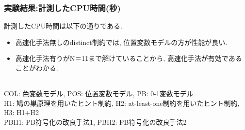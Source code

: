 \documentclass [dvipdfmx,11pt]{beamer}
\begin{document}
\begin{frame}
    \frametitle{実験結果:計測したCPU時間(秒)}
    計測したCPU時間は以下の通りである.
    \begin{block}{}
        {\tiny  }
    \end{block}
    \begin{itemize}
        \item 高速化手法無しのdistinct制約では, 位置変数モデルの方が性能が良い.
        \item 高速化手法有りがN＝11まで解けていることから, 高速化手法が有効であることがわかる.
    \end{itemize}
    \\
    \vspace{-3mm}
    {\tiny COL: 色変数モデル, POS: 位置変数モデル, PB: 0-1変数モデル}\\
    \vspace{-3mm}
    {\tiny H1: 鳩の巣原理を用いたヒント制約, H2: at-least-one制約を用いたヒント制約, H3: H1+H2}\\
    \vspace{-3mm}
    {\tiny PBH1: PB符号化の改良手法1, PBH2: PB符号化の改良手法2}\\
\end{frame}
\end{document}
